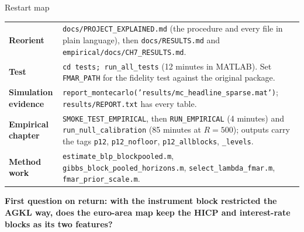 \documentclass[aspectratio=169,11pt]{beamer}
\begin{document}
\begin{frame}{Restart map}
  \vspace{-1mm}
  {\fontsize{9.6}{11.6}\selectfont
  \renewcommand{\arraystretch}{1.08}
  \begin{tabularx}{\textwidth}{>{\bfseries\color{Teal}}p{} X}
    Reorient & \texttt{docs/PROJECT\_EXPLAINED.md} (the procedure and every file in plain language), then \texttt{docs/RESULTS.md} and \texttt{empirical/docs/CH7\_RESULTS.md}.\\[1.5mm]
    Test & \texttt{cd tests; run\_all\_tests} (12 minutes in MATLAB). Set \texttt{FMAR\_PATH} for the fidelity test against the original package.\\[1.5mm]
    Simulation evidence & \texttt{report\_montecarlo('results/mc\_headline\_sparse.mat')}; \texttt{results/REPORT.txt} has every table.\\[1.5mm]
    Empirical chapter & \texttt{SMOKE\_TEST\_EMPIRICAL}, then \texttt{RUN\_EMPIRICAL} (4 minutes) and \texttt{run\_null\_calibration} (85 minutes at $R=500$); outputs carry the tags \texttt{p12}, \texttt{p12\_nofloor}, \texttt{p12\_allblocks}, \texttt{\_levels}.\\[1.5mm]
    Method work & \texttt{estimate\_blp\_blockpooled.m}, \texttt{gibbs\_block\_pooled\_horizons.m}, \texttt{select\_lambda\_fmar.m}, \texttt{fmar\_prior\_scale.m}.\\
  \end{tabularx}}
  \vfill
  {\fontsize{12.5}{15.5}\selectfont\bfseries
   First question on return: with the instrument block restricted the AGKL way, does the euro-area map keep the HICP and interest-rate blocks as its two features?}
\end{frame}
\end{document}
